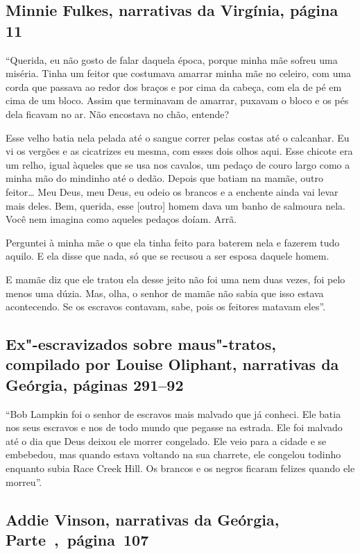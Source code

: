 \subsection{Minnie Fulkes, narrativas da Virgínia, página 11} \label{ref94}

``Querida, eu não gosto de falar daquela época, porque minha mãe sofreu
uma miséria. Tinha um feitor que costumava amarrar minha mãe no celeiro,
com uma corda que passava ao redor dos braços e por cima da cabeça, com
ela de pé em cima de um bloco. Assim que terminavam de amarrar, puxavam
o bloco e os pés dela ficavam no ar. Não encostava no chão, entende?

Esse velho batia nela pelada até o sangue correr pelas costas até o
calcanhar. Eu vi os vergões e as cicatrizes eu mesma, com esses dois
olhos aqui. Esse chicote era um relho, igual àqueles que se usa nos
cavalos, um pedaço de couro largo como a minha mão do mindinho até o
dedão. Depois que batiam na mamãe, outro feitor\ldots{} Meu Deus, meu
Deus, eu odeio os brancos e a enchente ainda vai levar mais deles. Bem,
querida, esse {[}outro{]} homem dava um banho de salmoura nela. Você nem
imagina como aqueles pedaços doíam. Arrã.

Perguntei à minha mãe o que ela tinha feito para baterem nela e fazerem
tudo aquilo. E ela disse que nada, só que se recusou a ser esposa
daquele homem.

E mamãe diz que ele tratou ela desse jeito não foi uma nem duas vezes,
foi pelo menos uma dúzia. Mas, olha, o senhor de mamãe não sabia que
isso estava acontecendo. Se os escravos contavam, sabe, pois os feitores %
matavam eles''.

\subsection{Ex"-escravizados sobre maus"-tratos, compilado por Louise Oliphant, narrativas
da Geórgia, páginas 291--92}

``Bob Lampkin foi o senhor de escravos mais malvado que já conheci. Ele
batia nos seus escravos e nos de todo mundo que pegasse na estrada. Ele
foi malvado até o dia que Deus deixou ele morrer congelado. Ele veio
para a cidade e se embebedou, mas quando estava voltando na sua
charrete, ele congelou todinho enquanto subia Race Creek Hill. Os
brancos e os negros ficaram felizes quando ele morreu''.

\subsection{Addie Vinson, narrativas da Geórgia, Parte~,~página~107}
\label{ref267}

